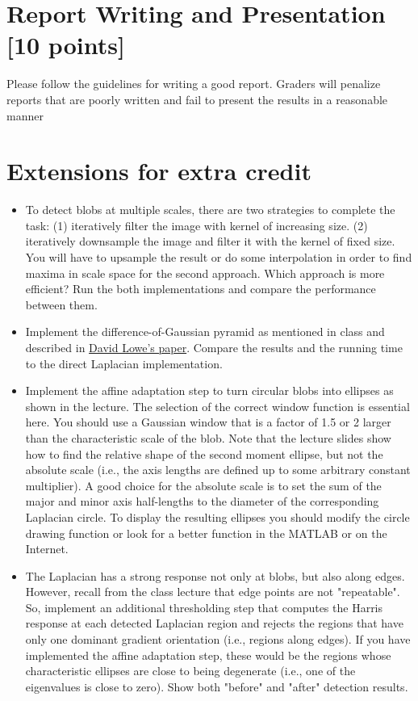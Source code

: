 \documentclass[10pt,letterpaper]{article}
\begin{document}
\section{Report Writing and Presentation [10 points]}
Please follow the guidelines for writing a good report. Graders will penalize reports that are poorly written and fail to present the results in a reasonable manner

\vspace{-0.1in}
\section{Extensions for extra credit}
\begin{itemize}
\item To detect blobs at multiple scales, there are two strategies to complete the task: (1) iteratively filter the image with kernel of increasing size. (2) iteratively downsample the image and filter it with the kernel of fixed size. You will have to upsample the result or do some interpolation in order to find maxima in scale space for the second approach. Which approach is more efficient? Run the both implementations and compare the performance between them.

\item Implement the difference-of-Gaussian pyramid as mentioned in class and described in \href{http://www.cs.ubc.ca/~lowe/papers/ijcv04.pdf}{David Lowe's paper}. Compare the results and the running time to the direct Laplacian implementation.

\item Implement the affine adaptation step to turn circular blobs into ellipses as shown in the lecture. The selection of the correct window function is essential here. You should use a Gaussian window that is a factor of 1.5 or 2 larger than the characteristic scale of the blob. Note that the lecture slides show how to find the relative shape of the second moment ellipse, but not the absolute scale (i.e., the axis lengths are defined up to some arbitrary constant multiplier). A good choice for the absolute scale is to set the sum of the major and minor axis half-lengths to the diameter of the corresponding Laplacian circle. To display the resulting ellipses you should modify the circle drawing function or look for a better function in the MATLAB or on the Internet.

\item The Laplacian has a strong response not only at blobs, but also along edges. However, recall from the class lecture that edge points are not "repeatable". So, implement an additional thresholding step that computes the Harris response at each detected Laplacian region and rejects the regions that have only one dominant gradient orientation (i.e., regions along edges). If you have implemented the affine adaptation step, these would be the regions whose characteristic ellipses are close to being degenerate (i.e., one of the eigenvalues is close to zero). Show both "before" and "after" detection results.


\end{itemize}
\end{document}
